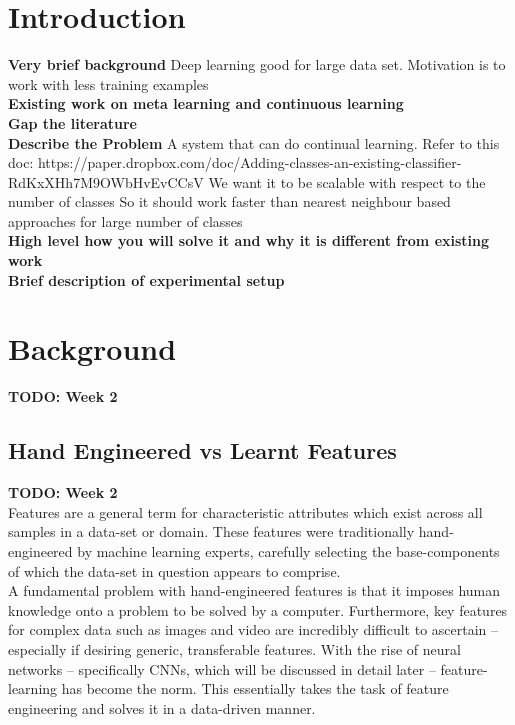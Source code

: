 \documentclass{report}
\title{}
\author{Ash}
\begin{document}
	
	\maketitle
	\thispagestyle{empty}
	\newpage
	\thispagestyle{empty}
	\tableofcontents
	\newpage
	\thispagestyle{empty}
	\listoffigures
	\newpage
	
	\chapter{Introduction}
	\textbf{Very brief background}
	Deep learning good for large data set.
	Motivation is to work with less training examples \\
	\textbf{Existing work on meta learning and continuous learning} \\
	\textbf{Gap the literature} \\
	\textbf{Describe the Problem}
	A system that can do continual learning. Refer to this doc:
	https://paper.dropbox.com/doc/Adding-classes-an-existing-classifier-RdKxXHh7M9OWbHvEvCCsV
	We want it to be scalable with respect to the number of classes
	So it should work faster than nearest neighbour based approaches for large number of classes \\
	\textbf{High level how you will solve it and why it is different from existing work} \\
	\textbf{Brief description of experimental setup} \\
	
	
	\chapter{Background}
	\textbf{TODO: Week 2} \\
	\section{Hand Engineered vs Learnt Features}
	\textbf{TODO: Week 2} \\
	Features are a general term for characteristic attributes which exist across all samples in a data-set or domain. These features were traditionally hand-engineered by machine learning experts, carefully selecting the base-components of which the data-set in question appears to comprise. \\
	A fundamental problem with hand-engineered features is that it imposes human knowledge onto a problem to be solved by a computer. Furthermore, key features for complex data such as images and video are incredibly difficult to ascertain -- especially if desiring generic, transferable features. With the rise of neural networks -- specifically CNNs, which will be discussed in detail later -- feature-learning has become the norm. This essentially takes the task of feature engineering and solves it in a data-driven manner.
\end{document}
